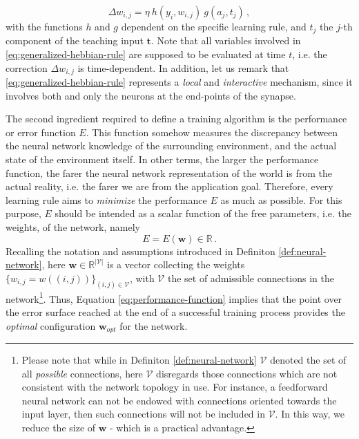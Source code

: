 \documentclass[11pt, a4paper]{report}
\numberwithin{equation}{chapter}
\theoremstyle{theorem}
\theoremstyle{definition}
\numberwithin{figure}{section}
\begin{document}
		\begin{equation}
			\label{eq:generalized-hebbian-rule}
			\Delta w_{i,j} = \eta ~ h(y_i,w_{i,j}) ~ g(a_j,t_j) \, ,
		\end{equation}
		with the functions $h$ and $g$ dependent on the specific learning rule, and $t_j$ the $j$-th component of the teaching input $\boldsymbol{t}$. Note that all variables involved in \eqref{eq:generalized-hebbian-rule} are supposed to be evaluated at time $t$, i.e. the correction $\Delta w_{i,j}$ is time-dependent. In addition, let us remark that \eqref{eq:generalized-hebbian-rule} represents a \emph{local} and \emph{interactive} mechanism, since it involves both and only the neurons at the end-points of the synapse.
		
		The second ingredient required to define a training algorithm is the performance or error function $E$. This function somehow measures the discrepancy between the neural network knowledge of the surrounding environment, and the actual state of the environment itself. In other terms, the larger the performance function, the farer the neural network representation of the world is from the actual reality, i.e. the farer we are from the application goal. Therefore, every learning rule aims to \emph{minimize} the performance $E$ as much as possible. For this purpose, $E$ should be intended as a scalar function of the free parameters, i.e. the weights, of the network, namely 
		\begin{equation}
			\label{eq:performance-function}
			E = E(\boldsymbol{w}) \in \mathbb{R} \, . 
		\end{equation}
		Recalling the notation and assumptions introduced in Definiton \ref{def:neural-network}, here $\boldsymbol{w} \in \mathbb{R}^{|\mathcal{V}|}$ is a vector collecting the weights $\lbrace w_{i,j} = w((i,j)) \rbrace_{(i,j) \in \mathcal{V}}$, with $\mathcal{V}$ the set of admissible connections in the network\footnote{Please note that while in Definiton \ref{def:neural-network} $\mathcal{V}$ denoted the set of all \emph{possible} connections, here $\mathcal{V}$ disregards those connections which are not consistent with the network topology in use. For instance, a feedforward neural network can not be endowed with connections oriented towards the input layer, then such connections will not be included in $\mathcal{V}$. In this way, we reduce the size of $\boldsymbol{w}$ - which is a practical advantage.}. Thus, Equation \eqref{eq:performance-function} implies that the point over the error surface reached at the end of a successful training process provides the \emph{optimal} configuration $\boldsymbol{w}_{opt}$ for the network.
		
\end{document}
